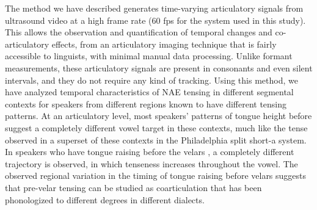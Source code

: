 \documentclass[output=paper]{LSP/langsci}
\begin{document}
The method we have described generates time-varying articulatory signals from ultrasound video at a high frame rate (60 fps for the system used in this study). This allows the observation and quantification of temporal changes and co-articulatory effects, from an articulatory imaging technique that is fairly accessible to linguists, with minimal manual data processing.  Unlike formant measurements, these articulatory signals are present in consonants and even silent intervals, and they do not require any kind of tracking.  Using this method, we have analyzed temporal characteristics of NAE \ips{\ae} tensing in different segmental contexts for speakers from different regions known to have different \ips{\ae} tensing patterns. At an articulatory level, most speakers' patterns of tongue height before  suggest a completely different vowel target in these contexts, much like the tense \ips{\ae} observed in a superset of these contexts in the Philadelphia split short-a system.  In speakers who have tongue raising before the velars , a completely different trajectory is observed, in which tenseness increases throughout the vowel.  The observed regional variation in the timing of tongue raising before velars suggests that pre-velar \ips{\ae} tensing can be studied as coarticulation that has been phonologized to different degrees in different dialects.
\printbibliography[heading=subbibliography,notkeyword=this]
\end{document}
